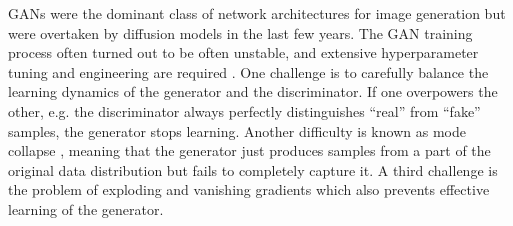 \gls{GAN}s were the dominant class of network architectures for image generation \cite{StyleGAN_T, StyleGAN_3, FastGAN} but were overtaken by diffusion models in the last few years. The \gls{GAN} training process often turned out to be often unstable, and extensive hyperparameter tuning and engineering are required \cite{ImprovedGANTraining, PacGAN}. One challenge is to carefully balance the learning dynamics of the generator and the discriminator. If one overpowers the other, e.g. the discriminator always perfectly distinguishes ``real'' from ``fake'' samples, the generator stops learning. Another difficulty is known as mode collapse \cite{ModeCollapse1}, meaning that the generator just produces samples from a part of the original data distribution but fails to completely capture it. A third challenge is the problem of exploding and vanishing gradients \cite{WGAN} which also prevents effective learning of the generator.
